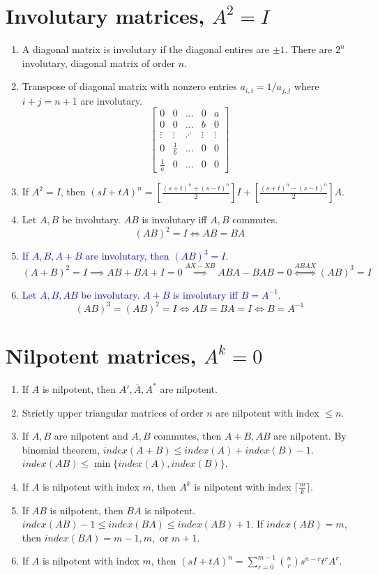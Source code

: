 \section{Involutary matrices, $A^2=I$}
\begin{enumerate}
	\item A diagonal matrix is involutary if the diagonal entires are $\pm 1$.
		\subitem There are $2^n$ involutary, diagonal matrix of order $n$.
	\item Transpose of diagonal matrix with nonzero entries $a_{i,i} = 1/a_{j,j}$ where $i+j = n+1$ are involutary.
		$$\begin{bmatrix}0 & 0 & \dots & 0 & a \\ 0 & 0 & \dots & b & 0 \\ \vdots & \vdots & \iddots & \vdots & \vdots \\ 0 & \frac{1}{b} & \dots & 0 & 0 \\ \frac{1}{a} & 0 & \dots & 0 & 0 \end{bmatrix}$$
	\item If $A^2 = I$, then $(sI+tA)^n = \left[\frac{(s+t)^n+(s-t)^n}{2}\right]I + \left[\frac{(s+t)^n-(s-t)^n}{2}\right]A$.
	\item Let $A,B$ be involutary. $AB$ is involutary iff $A,B$ commutes.
		$$ (AB)^2 = I \iff AB = BA $$
	\item \textcolor{blue}{If $A,B,A+B$ are involutary, then $(AB)^3 = I$.}
		$$(A+B)^2 = I \implies AB+BA+I = 0 \overset{AX-XB}{\implies} ABA-BAB = 0 \overset{ABAX}{\iff} (AB)^3=I $$
	\item \textcolor{blue}{Let $A,B,AB$ be involutary. $A+B$ is involutary iff $B=A^{-1}$.}
		$$ (AB)^3 = (AB)^2 = I \iff AB = BA = I  \iff B = A^{-1} $$
\end{enumerate}

\section{Nilpotent matrices, $A^k=0$}
\begin{enumerate}
	\item If $A$ is nilpotent, then $A',\bar{A},A^\ast$ are nilpotent.
	\item Strictly upper triangular matrices of order $n$ are nilpotent with index $\le n$.
	\item If $A,B$ are nilpotent and $A,B$ commutes, then $A+B,AB$ are nilpotent.
		\subitem By binomial theorem, $index(A+B) \le index(A) + index(B) -1$.
		\subitem $index(AB) \le \min\{ index(A),index(B) \}$.
	\item If $A$ is nilpotent with index $m$, then $A^k$ is nilpotent with index $\lceil \frac{m}{k} \rceil$.
	\item If $AB$ is nilpotent, then $BA$ is nilpotent.
		\subitem $index(AB)-1 \le index(BA) \le index(AB)+1$.
		\subitem If $index(AB) = m$, then $index(BA) = m-1,m, \text{ or } m+1$.
	\item If $A$ is nilpotent with index $m$, then $(sI+tA)^n = \sum_{r=0}^{m-1}\binom{n}{r} s^{n-r}t^rA^r$.
\end{enumerate}

